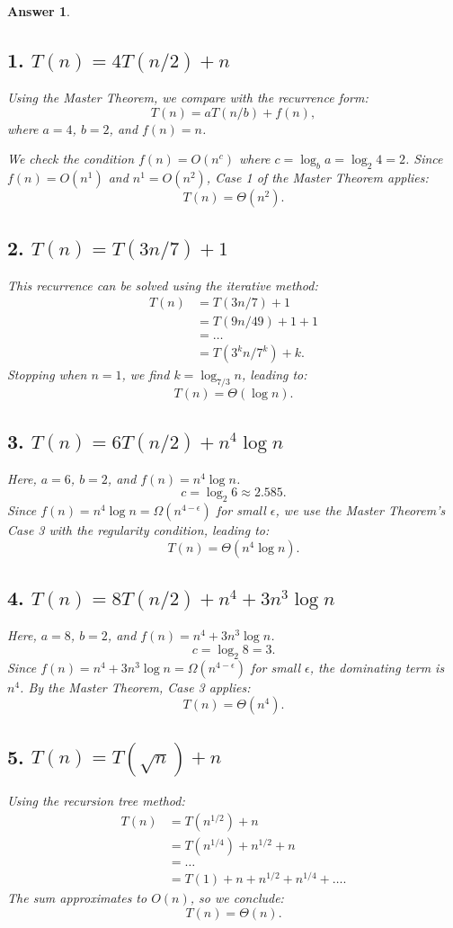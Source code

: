 \documentclass[a4paper]{article}
\theoremstyle{remarksStyle}
\theoremstyle{questionStyle}
\theoremstyle{answerStyle}
\newtheorem{answer}{Answer}
\begin{document}
\begin{answer}
\item
    \subsection*{1. \( T(n) = 4T(n/2) + n \)}
Using the Master Theorem, we compare with the recurrence form:
\[
T(n) = aT(n/b) + f(n),
\]
where \( a = 4 \), \( b = 2 \), and \( f(n) = n \).

We check the condition \( f(n) = O(n^c) \) where \( c = \log_b a = \log_2 4 = 2 \).
Since \( f(n) = O(n^1) \) and \( n^1 = O(n^2) \), Case 1 of the Master Theorem applies:
\[
T(n) = \Theta(n^2).
\]

\subsection*{2. \( T(n) = T(3n/7) + 1 \)}
This recurrence can be solved using the iterative method:
\begin{align*}
T(n) &= T(3n/7) + 1 \\
&= T(9n/49) + 1 + 1 \\
&= \dots \\
&= T(3^k n / 7^k) + k.
\end{align*}
Stopping when \( n = 1 \), we find \( k = \log_{7/3} n \), leading to:
\[
T(n) = \Theta(\log n).
\]

\subsection*{3. \( T(n) = 6T(n/2) + n^4 \log n \)}
Here, \( a = 6 \), \( b = 2 \), and \( f(n) = n^4 \log n \).
\[
c = \log_2 6 \approx 2.585.
\]
Since \( f(n) = n^4 \log n = \Omega(n^{4 - \epsilon}) \) for small \( \epsilon \), we use the Master Theorem’s Case 3 with the regularity condition, leading to:
\[
T(n) = \Theta(n^4 \log n).
\]

\subsection*{4. \( T(n) = 8T(n/2) + n^4 + 3n^3 \log n \)}
Here, \( a = 8 \), \( b = 2 \), and \( f(n) = n^4 + 3n^3 \log n \).
\[
c = \log_2 8 = 3.
\]
Since \( f(n) = n^4 + 3n^3 \log n = \Omega(n^{4-\epsilon}) \) for small \( \epsilon \), the dominating term is \( n^4 \). By the Master Theorem, Case 3 applies:
\[
T(n) = \Theta(n^4).
\]

\subsection*{5. \( T(n) = T(\sqrt{n}) + n \)}
Using the recursion tree method:
\begin{align*}
T(n) &= T(n^{1/2}) + n \\
&= T(n^{1/4}) + n^{1/2} + n \\
&= \dots \\
&= T(1) + n + n^{1/2} + n^{1/4} + \dots.
\end{align*}
The sum approximates to \( O(n) \), so we conclude:
\[
T(n) = \Theta(n).
\]

\end{answer}
\end{document}
